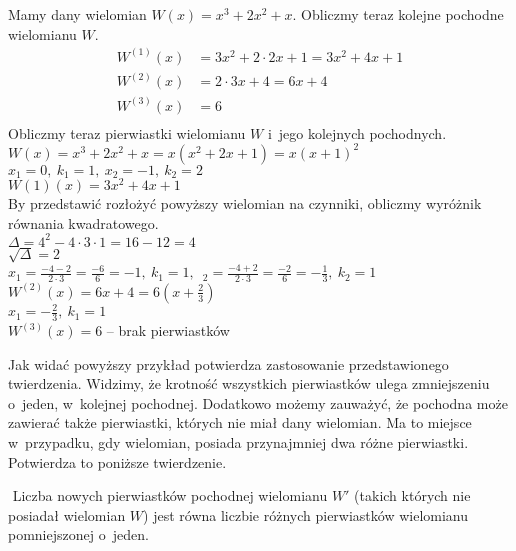 \begin{example}
	$ $\\
	Mamy dany wielomian $W(x) = x^3 + 2x^2 + x$. Obliczmy teraz kolejne pochodne wielomianu $W$. \\
	\begin{equation*}
	\begin{split}
		W^{(1)}(x) &= 3x^2 + 2 \cdot 2x + 1 = 3x^2 + 4x + 1 \\
		W^{(2)}(x) &= 2 \cdot 3x + 4 = 6x + 4 \\
		W^{(3)}(x) &= 6 \\
	\end{split}
	\end{equation*}
	Obliczmy teraz pierwiastki wielomianu $W$ i~jego kolejnych pochodnych. \\
	$W(x) = x^3 + 2x^2 + x = x(x^2 + 2x +1) = x(x + 1)^2$ \\
	$x_1 = 0,\ k_1 = 1,\ x_2 = -1,\ k_2 = 2$ \\
	$W{(1)}(x) = 3x^2 + 4x + 1$ \\
	By przedstawić rozłożyć powyższy wielomian na czynniki, obliczmy wyróżnik równania kwadratowego.\\
	$\Delta = 4^2 - 4 \cdot 3 \cdot 1 = 16 - 12 = 4$ \\
	$\sqrt{\Delta} = 2$ \\
	$x_1 = \frac{-4-2}{2 \cdot 3} = \frac{-6}{6} = -1,\ k_1 = 1,$\ $_2 = \frac{-4+2}{2 \cdot 3} = \frac{-2}{6} = -\frac{1}{3},\ k_2 = 1$ \\
	$W^{(2)}(x) = 6x + 4 = 6 (x + \frac{2}{3})$ \\
	$x_1 = -\frac{2}{3},\ k_1 = 1$ \\
	$W^{(3)}(x) = 6$ -- brak pierwiastków
\end{example}

Jak widać powyższy przykład potwierdza zastosowanie przedstawionego twierdzenia. Widzimy, że krotność wszystkich pierwiastków ulega zmniejszeniu o~jeden, w~kolejnej pochodnej. Dodatkowo możemy zauważyć, że pochodna może zawierać także pierwiastki, których nie miał dany wielomian. Ma to miejsce w~przypadku, gdy wielomian, posiada przynajmniej dwa różne pierwiastki. Potwierdza to poniższe twierdzenie.

\begin{theorem}
	$ $
	Liczba nowych pierwiastków pochodnej wielomianu $W'$ (takich których nie posiadał wielomian $W$) jest równa liczbie różnych pierwiastków wielomianu pomniejszonej o~jeden.
\end{theorem}

